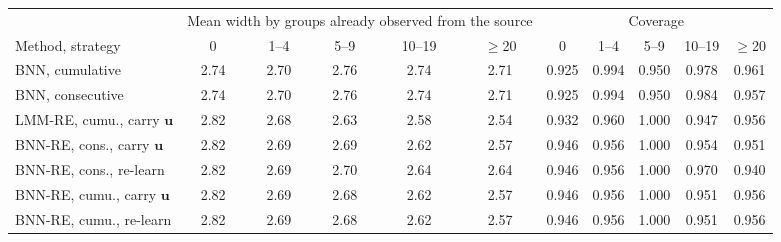 \begin{tabular}{l ccccc ccccc}
\hline
 & \multicolumn{5}{c}{Mean width by groups already observed from the source} & \multicolumn{5}{c}{Coverage} \\
\cline{2-6}\cline{7-11}
Method, strategy & 0 & 1--4 & 5--9 & 10--19 & $\geq$20 & 0 & 1--4 & 5--9 & 10--19 & $\geq$20 \\
\hline
BNN, cumulative & 2.74 & 2.70 & 2.76 & 2.74 & 2.71 & 0.925 & 0.994 & 0.950 & 0.978 & 0.961 \\
BNN, consecutive & 2.74 & 2.70 & 2.76 & 2.74 & 2.71 & 0.925 & 0.994 & 0.950 & 0.984 & 0.957 \\
LMM-RE, cumu., carry $\bm u$ & 2.82 & 2.68 & 2.63 & 2.58 & 2.54 & 0.932 & 0.960 & 1.000 & 0.947 & 0.956 \\
BNN-RE, cons., carry $\bm u$ & 2.82 & 2.69 & 2.69 & 2.62 & 2.57 & 0.946 & 0.956 & 1.000 & 0.954 & 0.951 \\
BNN-RE, cons., re-learn & 2.82 & 2.69 & 2.70 & 2.64 & 2.64 & 0.946 & 0.956 & 1.000 & 0.970 & 0.940 \\
BNN-RE, cumu., carry $\bm u$ & 2.82 & 2.69 & 2.68 & 2.62 & 2.57 & 0.946 & 0.956 & 1.000 & 0.951 & 0.956 \\
BNN-RE, cumu., re-learn & 2.82 & 2.69 & 2.68 & 2.62 & 2.57 & 0.946 & 0.956 & 1.000 & 0.951 & 0.956 \\
\hline
\end{tabular}